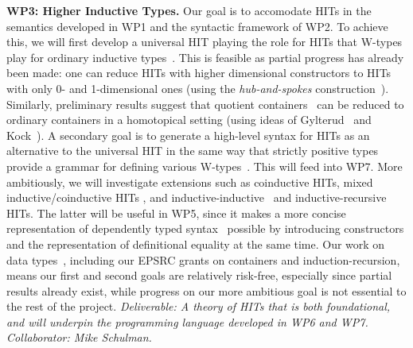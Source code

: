 \documentclass[a4paper,11pt]{article}
\begin{document}
{\bf WP3: Higher Inductive Types.} Our goal is to accomodate HITs in
the semantics developed in WP1 and the syntactic framework of WP2. To
achieve this, we will first develop a universal HIT playing the role for
HITs that W-types play for ordinary inductive
types~\cite{alti:icalp04}. This is feasible as partial progress has
already been made: one can reduce HITs with higher dimensional
constructors to HITs with only 0- and 1-dimensional ones (using the
\emph{hub-and-spokes} construction~\cite{hott-book}).
Similarly, preliminary results suggest that quotient
containers~\cite{abottAltenGhaniMcB:quotientContainers} can be reduced
to ordinary containers in a homotopical setting 
(using ideas of Gylterud~\cite{gylterud:thesis} and
Kock~\cite{kock:groupoids}).
%
A secondary goal is to generate a high-level syntax for HITs as
an alternative to the universal HIT in the same way that strictly
positive types provide a grammar for defining various
W-types~\cite{alti:cont-tcs,alti:jcats07}.  This will feed into WP7.
More ambitiously, we will %
investigate extensions such as coinductive HITs, mixed
inductive/coinductive HITs \cite{txa:mpc2010g}, and
inductive-inductive~\cite{fnf:indind} and
inductive-recursive~\cite{DS:indrec} HITs. The latter will be useful
in WP5, since it makes a more concise representation of dependently
typed syntax~\cite{chapman2009type} possible by introducing
constructors and the representation of definitional equality at the
same time.
Our work on data
types~\cite{alti:cont-tcs,alti:lics09,txa:cie10,alti:catind2,ghani:fibredIR,gambinoHyland:welfoundedTrees,awodeyGamSoja:indTypesInHTT},
including our EPSRC grants on containers and induction-recursion, means
our first and second goals
are relatively risk-free,
especially since partial results already exist, 
while progress on our more ambitious goal 
is not essential to the rest of the project. {\em Deliverable: A
  theory of HITs that is both foundational, and will underpin the
  programming language developed in WP6 and WP7. Collaborator: 
  Mike Schulman. }
\end{document}
